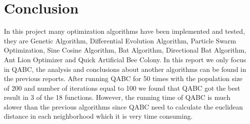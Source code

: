 \documentclass[12pt]{article}
\begin{document}
    \section{Conclusion}



    In this project many optimization algorithms have been implemented and tested, they are Genetic Algorithm, Differential Evolution Algorithm, Particle Swarm Optimization, Sine Cosine Algorithm, Bat Algorithm, Directional Bat Algorithm, Ant Lion Optimizer and Quick Artificial Bee Colony. In this report we only focus in QABC, the analysis and conclusions about another algorithms can be found in the previous reports. After running QABC for 50 times with the population size of 200 and number of iterations equal to 100 we found that QABC got the best result in 3 of the 18 functions. However, the running time of QABC is much slower than the previous algorithms since QABC need to calculate the euclidean distance in each neighborhood which it is very time consuming. 


\end{document}
